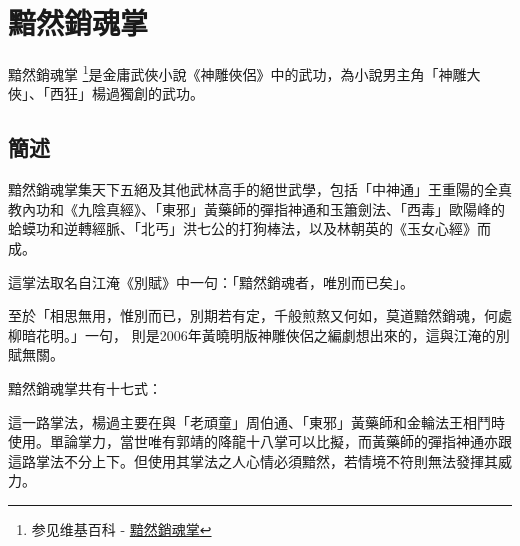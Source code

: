 \chapter{黯然銷魂掌}
黯然銷魂掌
\footnote{参见维基百科 - \href{http://zh.wikipedia.org/wiki/\%E9\%BB\%AF\%E7\%84\%B6\%E9\%8A\%B7\%E9\%AD\%82\%E6\%8E\%8C}{
    黯然銷魂掌}}是金庸武俠小說《神雕俠侶》中的武功，為小說男主角「神雕大俠」、「西狂」楊過獨創的武功。

\section{簡述}

黯然銷魂掌集天下五絕及其他武林高手的絕世武學，包括「中神通」王重陽的全真教內功和《九陰真經》、「東邪」黃藥師的彈指神通和玉簫劍法、「西毒」歐陽峰的蛤蟆功和逆轉經脈、「北丐」洪七公的打狗棒法，以及林朝英的《玉女心經》而成。

這掌法取名自江淹《別賦》中一句：「黯然銷魂者，唯別而已矣」。

至於「相思無用，惟別而已，別期若有定，千般煎熬又何如，莫道黯然銷魂，何處柳暗花明。」一句， 則是2006年黃曉明版神雕俠侶之編劇想出來的，這與江淹的別賦無關。

黯然銷魂掌共有十七式：

這一路掌法，楊過主要在與「老頑童」周伯通、「東邪」黃藥師和金輪法王相鬥時使用。單論掌力，當世唯有郭靖的降龍十八掌可以比擬，而黃藥師的彈指神通亦跟這路掌法不分上下。但使用其掌法之人心情必須黯然，若情境不符則無法發揮其威力。

